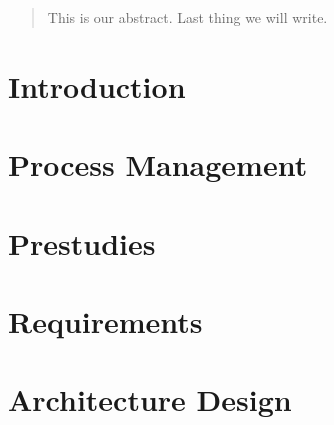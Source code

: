 \documentclass[11pt,a4paper,twoside]{report}
\begin{document}



\begin{abstract}
This is our abstract. Last thing we will write.
\end{abstract}

\cleardoublepage
\tableofcontents
\cleardoublepage

\listoffigures
\cleardoublepage

\listoftables



\cleardoublepage
\chapter{Introduction}\label{ch:introduction}


\cleardoublepage
\chapter{Process Management}\label{ch:management}


\cleardoublepage
\chapter{Prestudies}\label{ch:prestudies}


\cleardoublepage
\chapter{Requirements}\label{ch:requirements}


\cleardoublepage
\chapter{Architecture Design}\label{ch:architecture}

\end{document}
